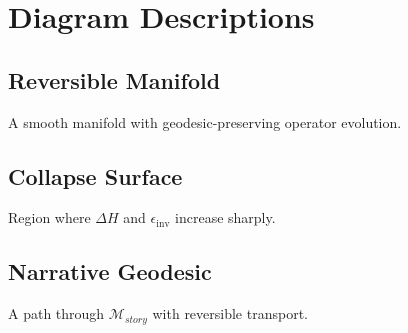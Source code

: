 \section*{Diagram Descriptions}

\subsection*{Reversible Manifold}
A smooth manifold with geodesic-preserving operator evolution.

\subsection*{Collapse Surface}
Region where $\Delta H$ and $\epsilon_{\text{inv}}$ increase sharply.

\subsection*{Narrative Geodesic}
A path through $\mathcal{M}_{story}$ with reversible transport.
